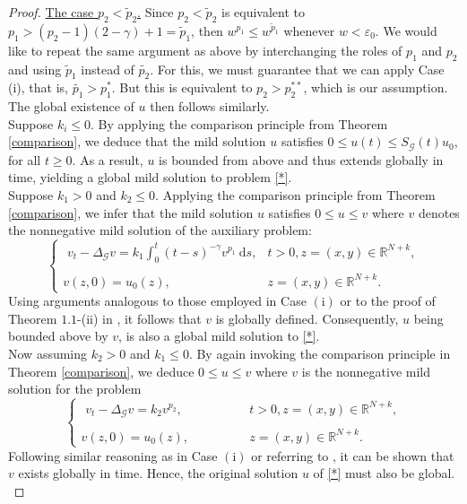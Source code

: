 \documentclass[a4,psfig,english,12pt,epsf,portrait]{article}
\numberwithin{equation}{section}
\begin{document}
\begin{proof}
	
	\underline{The case $p_2< \tilde{p}_2$.}  Since $p_2< \tilde{p}_2$ is equivalent to $p_1 > (p_2-1)(2-\gamma)+1 = \tilde{p}_1$, then $w^{p_1}\leq w^{\tilde{p}_1}$ whenever $w<\varepsilon_0$. We would like to repeat the same argument as above by interchanging the roles of $p_1$ and $p_2$ and using $\tilde{p}_1$ instead of $\tilde{p_2}$. For this, we must guarantee that we can apply Case (i), that is, $\tilde{p_1}>p_1^*$. But this is equivalent to  $p_2>p_2^{**}$, which is our assumption. The global existence of $u$ then follows similarly.\\
	
	 Suppose $k_i\leq0$. By applying the comparison principle from Theorem \ref{comparison}, we deduce that the mild solution $u$ satisfies $0\leq u(t)\leq S_{\mathcal{G}}(t)u_0$, for all $t\geq0$. As a result, $u$ is bounded from above and thus extends globally in time, yielding a global mild solution to problem \eqref{*}.\\
	
	 Suppose $k_1>0$ and $k_2\leq 0$. Applying the comparison principle from Theorem \ref{comparison}, we infer that the mild solution $u$ satisfies $0\leq u\leq v$ where $v$ denotes the nonnegative mild solution of the auxiliary problem:
	\begin{equation}\label{memory}
		\left\{\begin{array}{ll}
			\,\, \displaystyle v_{t}-\Delta_{\mathcal{G}}
			v =  k_1\int_0^t (t-s)^{-\gamma}v^{p_1} \ \mathrm{d}s, & t>0,z=(x,y)\in {\mathbb{R}}^{N+k},\\
			{}\\
			\displaystyle{v(z,0)=  u_0(z),\qquad\qquad}& z=(x,y)\in {\mathbb{R}}^{N+k}.
		\end{array}
		\right.
	\end{equation}
	Using arguments analogous to those employed in Case $(\mathrm{i})$ or to the proof of Theorem $1.1$-(ii) in \cite{CDW}, it follows that $v$ is globally defined. Consequently, $u$ being bounded above by $v$, is also a global mild solution to \eqref{*}.\\
	
	 Now assuming $k_2>0$ and $k_1\leq0$. By again invoking the comparison principle in Theorem \ref{comparison}, we deduce $0\leq u\leq v$ where $v$ is the nonnegative mild solution for the problem 
	\begin{equation}\label{nomemory}
		\left\{\begin{array}{ll}
			\,\, \displaystyle v_{t}-\Delta_{\mathcal{G}}
			v= k_2v^{p_2}, & t>0,z=(x,y)\in {\mathbb{R}}^{N+k},\\
			{}\\
			\displaystyle{v(z,0)=  u_0(z),\qquad\qquad}& z=(x,y)\in {\mathbb{R}}^{N+k}.
		\end{array}
		\right.
	\end{equation}
	Following similar reasoning as in Case $(\mathrm{i})$ or referring to \cite[Theorem 4.2]{Oli-Vi-23}, it can be shown that $v$ exists globally in time. Hence, the original solution $u$  of \eqref{*} must also be global.\\
	

\end{proof}
\end{document}
